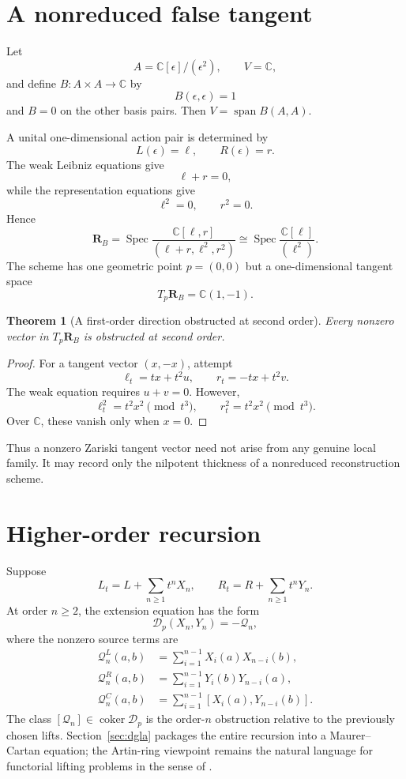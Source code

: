 \documentclass[11pt]{amsart}
\newtheorem{theorem}{Theorem}[section]
\newcommand{\Span}{\operatorname{span}}
\newcommand{\Spec}{\operatorname{Spec}}
\newcommand{\coker}{\operatorname{coker}}
\newcommand{\cD}{\mathscr D}
\newcommand{\cQ}{\mathscr Q}
\newcommand{\C}{\mathbb C}
\begin{document}
\section{A nonreduced false tangent}\label{sec:false-tangent}

Let
\[
A=\C[\epsilon]/(\epsilon^2),
\qquad
V=\C,
\]
and define $B:A\times A\to\C$ by
\[
B(\epsilon,\epsilon)=1
\]
and $B=0$ on the other basis pairs.  Then $V=\Span B(A,A)$.

A unital one-dimensional action pair is determined by
\[
L(\epsilon)=\ell,
\qquad
R(\epsilon)=r.
\]
The weak Leibniz equations give
\[
\ell+r=0,
\]
while the representation equations give
\[
\ell^2=0,
\qquad
r^2=0.
\]
Hence
\[
\mathbf R_B
=\Spec\frac{\C[\ell,r]}{(\ell+r,\ell^2,r^2)}
\cong
\Spec\frac{\C[\ell]}{(\ell^2)}.
\]
The scheme has one geometric point $p=(0,0)$ but a one-dimensional tangent space
\[
T_p\mathbf R_B=\C(1,-1).
\]

\begin{theorem}[A first-order direction obstructed at second order]\label{thm:false-tangent}
Every nonzero vector in $T_p\mathbf R_B$ is obstructed at second order.
\end{theorem}

\begin{proof}
For a tangent vector $(x,-x)$, attempt
\[
\ell_t=tx+t^2u,
\qquad
r_t=-tx+t^2v.
\]
The weak equation requires $u+v=0$.  However,
\[
\ell_t^2=t^2x^2\pmod{t^3},
\qquad
r_t^2=t^2x^2\pmod{t^3}.
\]
Over $\C$, these vanish only when $x=0$.
\end{proof}

Thus a nonzero Zariski tangent vector need not arise from any genuine local family.  It may record only the nilpotent thickness of a nonreduced reconstruction scheme.

\section{Higher-order recursion}

Suppose
\[
L_t=L+\sum_{n\ge1}t^nX_n,
\qquad
R_t=R+\sum_{n\ge1}t^nY_n.
\]
At order $n\ge2$, the extension equation has the form
\[
\cD_p(X_n,Y_n)=-\cQ_n,
\]
where the nonzero source terms are
\begin{align*}
\cQ_n^L(a,b)&=\sum_{i=1}^{n-1}X_i(a)X_{n-i}(b),\\
\cQ_n^R(a,b)&=\sum_{i=1}^{n-1}Y_i(b)Y_{n-i}(a),\\
\cQ_n^C(a,b)&=\sum_{i=1}^{n-1}[X_i(a),Y_{n-i}(b)].
\end{align*}
The class $[\cQ_n]\in\coker\cD_p$ is the order-$n$ obstruction relative to the previously chosen lifts.  Section~\ref{sec:dgla} packages the entire recursion into a Maurer--Cartan equation; the Artin-ring viewpoint remains the natural language for functorial lifting problems in the sense of \cite{Schlessinger1968}.
\end{document}
